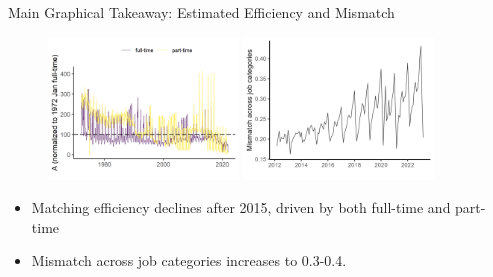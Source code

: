 \documentclass[aspectratio=169]{beamer}
\begin{document}
\begin{frame}{Main Graphical Takeaway: Estimated Efficiency and Mismatch}
\begin{figure}[!ht]
  \begin{center}
  \includegraphics[width = 0.45\textwidth]
  {figuretable/matching_efficiency_month_full_time_part_time.png}
  \includegraphics[width = 0.45\textwidth]
  {figuretable/mismatch_part_and_full_time_monthly_job_category.png}
  \end{center}
  \footnotesize
\end{figure} 
\begin{itemize}
    \item Matching efficiency declines after 2015, driven by both full-time and part-time
    \item Mismatch across job categories increases to 0.3-0.4.
\end{itemize}
\end{frame}
\end{document}
